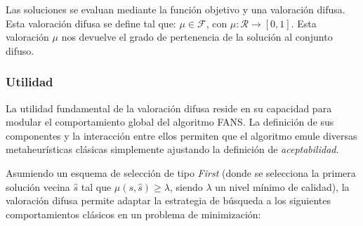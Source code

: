 \documentclass{article}
\begin{document}
Las soluciones se evaluan mediante la función objetivo y una valoración difusa. Esta valoración difusa se define tal que:
$\mu \in \mathcal{F}$, con $\mu : \mathcal{R} \rightarrow [0,1]$. Esta valoración $\mu$ nos devuelve el grado de pertenencia de la solución al conjunto difuso.

\subsubsection{Utilidad}

La utilidad fundamental de la valoración difusa reside en su capacidad para modular el comportamiento global del algoritmo FANS. La definición de sus componentes y la interacción entre ellos permiten que el algoritmo emule diversas metaheurísticas clásicas simplemente ajustando la definición de \emph{aceptabilidad}.

Asumiendo un esquema de selección de tipo \emph{First} (donde se selecciona la primera solución vecina $\hat{s}$ tal que $\mu(s, \hat{s}) \ge \lambda$, siendo $\lambda$ un nivel mínimo de calidad), la valoración difusa permite adaptar la estrategia de búsqueda a los siguientes comportamientos clásicos en un problema de minimización:
\end{document}
